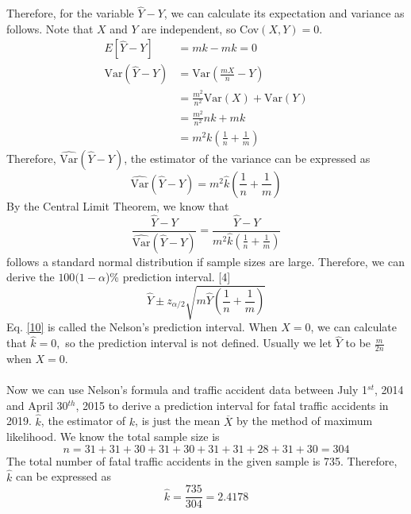 \documentclass[a4paper,12pt]{article}
\begin{document}
Therefore, for the variable $\widehat{Y}-Y$, we can calculate its expectation and variance as follows. Note that $X$ and $Y$ are independent, so Cov$(X,Y)=0$.
\begin{equation}\label{7}
\begin{aligned}
E[\widehat{Y}-Y]&=mk-mk=0\\
\text{Var}(\widehat{Y}-Y)&=\text{Var}(\frac{mX}{n}-Y)\\
&=\frac{m^2}{n^2}\text{Var}(X)+\text{Var}(Y)\\
&=\frac{m^2}{n^2}nk+mk\\
&=m^2k(\frac{1}{n}+\frac{1}{m})
\end{aligned}
\end{equation}
Therefore, $\widehat{\text{Var}}(\widehat{Y}-Y)$, the estimator of the variance can be expressed as 
\begin{equation}\label{8}
\widehat{\text{Var}}(\widehat{Y}-Y)=m^2\widehat{k}(\frac{1}{n}+\frac{1}{m})
\end{equation}
By the Central Limit Theorem, we know that 
\begin{equation}\label{9}
\frac{\widehat{Y}-Y}{\widehat{\text{Var}}(\widehat{Y}-Y)}=\frac{\widehat{Y}-Y}{m^2\widehat{k}(\frac{1}{n}+\frac{1}{m})}
\end{equation}
follows a standard normal distribution if sample sizes are large. Therefore, we can derive the $100(1-\alpha$)\% prediction interval. [4]
\begin{equation}\label{10}
\widehat{Y}\pm z_{\alpha/2}\sqrt{m\widehat{Y}(\frac{1}{n}+\frac{1}{m})}
\end{equation}
Eq. \eqref{10} is called the Nelson's prediction interval. When $X=0$, we can calculate that $ \widehat{k}=0,$ so the prediction interval is not defined. Usually we let $\widehat{Y}$ to be $\frac{m}{2n}$ when $X=0$.\\\\
Now we can use Nelson's formula and traffic accident data between July 1$^{st}$, 2014 and April 30$^{th}$, 2015 to derive a prediction interval for fatal traffic accidents in 2019. $\widehat{k}$, the estimator of $k$, is just the mean $\overline{X}$ by the method of maximum likelihood. We know the total sample size is 
\begin{equation*}
n=31+31+30+31+30+31+31+28+31+30=304
\end{equation*}
The total number of fatal traffic accidents in the given sample is 735. Therefore, $\widehat{k}$ can be expressed as 
\begin{equation}\label{11}
\widehat{k}=\frac{735}{304}=2.4178
\end{equation}
\end{document}
